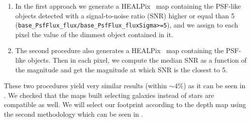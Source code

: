 \documentclass[\docopts]{\docclass}
\begin{document}
\begin{enumerate}
\item In the first approach we generate a HEALPix~\citep{2005ApJ...622..759G} map containing the PSF-like objects detected with a signal-to-noise ratio (SNR) higher or equal than 5 (\texttt{base\_PsfFlux\_flux/base\_PsfFlux\_fluxSigma>=5}), and we assign to each pixel the value of the
dimmest object contained in it.
\item The second procedure also generates a HEALPix~\citep{2005ApJ...622..759G} map containing the PSF-like objects. Then in each pixel, we compute the median SNR as a function of the magnitude and get the magnitude at which SNR is the closest to 5.
\end{enumerate}

These two procedures yield very similar results (within $\sim 4\%$) as it can be seen in . We checked that the maps built selecting galaxies instead of stars are compatible as well. We will select our footprint according to the depth map using the second methodology which can be seen in .
\end{document}
